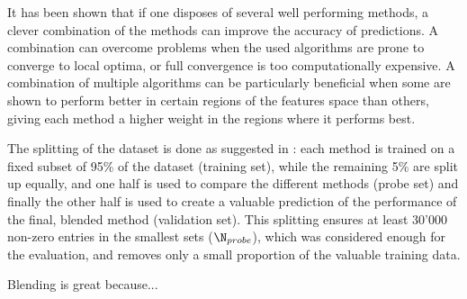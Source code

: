 It has been shown that if one disposes of several well performing methods,
a clever combination of the methods can improve the accuracy of predictions.   
A combination can overcome problems when the used algorithms are prone to
converge to local optima, or full convergence is too computationally expensive.
\cite{Dietterich}
A combination of multiple algorithms can be particularly beneficial when some
are shown to perform better in certain regions of the features space than
others, giving each method a higher weight in the regions where it performs
best.

The splitting of the dataset is done as suggested in
\cite{PresentationGrandPrize}: each method is trained on a fixed subset of 95\% of the
dataset (training set), while the remaining 5\% are split up equally, and one half is used to
compare the different methods (probe set) and finally the other half is used to create a
valuable prediction of the performance of the final, blended method (validation
set).  
This splitting ensures at least 30'000 non-zero entries in the smallest sets
($\N_{probe}$),
which was considered enough for the evaluation, and removes only a small
proportion of the valuable training data.

Blending is great because...
